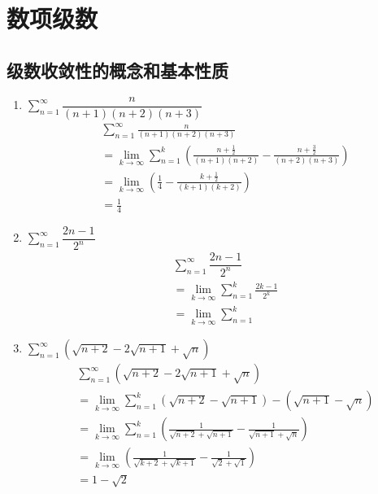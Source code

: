 \chapter{数项级数}
\section{级数收敛性的概念和基本性质}

\begin{enumerate}
    \item \(\sum\limits_{n=1}^{\infty}
        \dfrac{n}{(n+1)(n+2)(n+3)}\)
        \begin{align*}
            & \sum\limits_{n=1}^{\infty} \frac{n}{(n+1)(n+2)(n+3)} \\
            & = \lim_{k \to \infty} \sum\limits_{n=1}^{k}
            \left(\frac{n+\tfrac{1}{2}}{(n+1)(n+2)} -
            \frac{n+\tfrac{3}{2}}{(n+2)(n+3)}\right)                \\
            & = \lim_{k \to \infty} \left( \frac{1}{4} - \frac{k +
            \tfrac{1}{2}}{(k+1)(k+2)} \right)                       \\
            & = \frac{1}{4}
        \end{align*}
    \item \(\sum\limits_{n=1}^{\infty} \dfrac{2n-1}{2^{n}}\)
        \begin{align*}
            & \sum\limits_{n=1}^{\infty}
            \dfrac{2n-1}{2^{n}}          \\
            & = \lim_{k \to \infty} \sum_{n=1}^{k}
            \frac{2k-1}{2^{k}} \\
            & = \lim_{k \to \infty} \sum_{n=1}^{k}
        \end{align*}
    \item \(\sum\limits_{n=1}^{\infty} \left(
        \sqrt{n+2}-2\sqrt{n+1}+\sqrt{n} \right) \)
        \begin{align*}
            & \sum\limits_{n=1}^{\infty} \left(
            \sqrt{n+2}-2\sqrt{n+1}+\sqrt{n} \right)
            \\
            & = \lim_{k \to \infty} \sum_{n=1}^{k} \left(
            \sqrt{n+2}-\sqrt{n+1}\right) -
            \left(\sqrt{n+1}-\sqrt{n} \right) \\
            & = \lim_{k \to \infty}  \sum_{n=1}^{k} \left(
                \frac{1}{\sqrt{n+2}+\sqrt{n+1}} -
            \frac{1}{\sqrt{n+1}+\sqrt{n}} \right)
            \\
            & = \lim_{k \to \infty} \left(
                \frac{1}{\sqrt{k+2}+\sqrt{k+1}} -
            \frac{1}{\sqrt{2}+\sqrt{1}} \right)
            \\
            & = 1 - \sqrt{2}
        \end{align*}

\end{enumerate}

